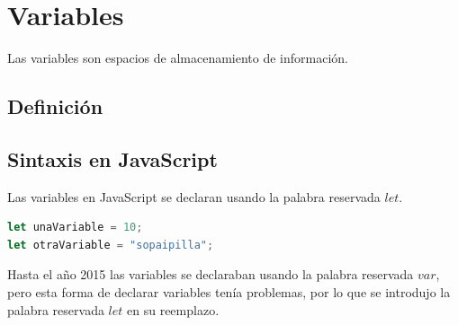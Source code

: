 \documentclass[../principal.tex]{subfiles}
\begin{document}
\chapter{Variables}

Las variables son espacios de almacenamiento de información.

\section{Definición}

\section{Sintaxis en JavaScript}

Las variables en JavaScript se declaran usando la palabra reservada $let$.

\begin{lstlisting}[language=JavaScript]
let unaVariable = 10;
let otraVariable = "sopaipilla";
\end{lstlisting}


Hasta el año 2015 las variables se declaraban usando la palabra reservada $var$, pero esta forma de declarar variables tenía problemas, por lo que se introdujo la palabra reservada $let$ en su reemplazo.
\end{document}
